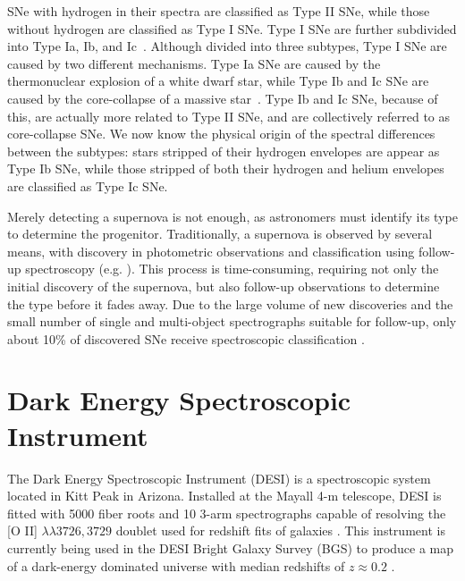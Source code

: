 SNe with hydrogen in their spectra are classified as Type II SNe, while those
without hydrogen are classified as Type I SNe. Type I SNe are further
subdivided into Type Ia, Ib, and Ic~\parencite{Turatto2003}. Although divided into three 
subtypes, Type I SNe are caused by two different mechanisms. Type Ia SNe are 
caused by the thermonuclear explosion of a white dwarf star, while Type Ib and Ic 
SNe are caused by the core-collapse of a massive star~\parencite{Filippenko1997}.
Type Ib and Ic SNe, because of this, are actually more related to Type II SNe,
and are collectively referred to as core-collapse SNe. We now know the physical
origin of the spectral differences between the subtypes: stars stripped of their 
hydrogen envelopes are appear as Type Ib SNe, while those stripped of both their 
hydrogen and helium envelopes are classified as Type Ic SNe.

Merely detecting a supernova is not enough, as astronomers must identify its
type to determine the progenitor. Traditionally, a supernova is observed by several 
means, with discovery in photometric observations and classification using follow-up 
spectroscopy (e.g. \textcite{Perlmutter1999}). This process is time-consuming, requiring not only 
the initial discovery of the supernova, but also follow-up observations to determine
the type before it fades away. Due to the large volume of new discoveries and 
the small number of single and multi-object spectrographs suitable for follow-up, only 
about 10\% of discovered SNe receive spectroscopic classification \parencite{TNS}. 

\section{Dark Energy Spectroscopic Instrument}
\label{sec:DESI}

The Dark Energy Spectroscopic Instrument (DESI) is a spectroscopic system located in Kitt Peak 
in Arizona. Installed at the Mayall 4-m telescope, DESI is fitted with 5000 fiber roots and 10 3-arm 
spectrographs capable of resolving the [O II] $\lambda \lambda3726,3729$ doublet used for redshift
fits of galaxies \parencite{Guy2023}. This instrument is currently being used in the DESI Bright 
Galaxy Survey (BGS) to produce a map of a dark-energy dominated universe with median redshifts of $z \approx 0.2$ 
\parencite{hahn2022, desicollaboration2016}. 

